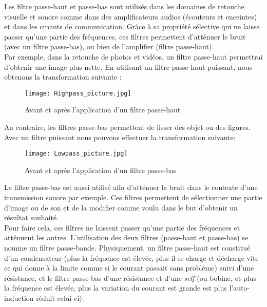 Les filtre passe-haut et passe-bas sont utilisés dans les domaines de retouche visuelle et sonore comme dans des amplificateurs audios (écouteurs et enceintes) et dans les circuits de communication. Grâce à sa propriété sélective qui ne laisse passer qu'une partie des fréquences, ces filtres permettent d'atténuer le bruit (avec un filtre passe-bas), ou bien de l'amplifier (filtre passe-haut). \\
Par exemple, dans la retouche de photos et vidéos, un filtre passe-haut permettrai d'obtenir une image plus nette. En utilisant un filtre passe-haut puissant, nous obtenons la transformation suivante :

\begin{figure}[H]
  \centering
    \texttt{[image: Highpass\_picture.jpg]}
    \caption[Avant et après l'application d'un filtre passe-haut]{Avant et après l'application d'un filtre passe-haut \footnotemark}
\end{figure}

Au contraire, les filtres passe-bas permettent de lisser des objet ou des figures. Avec un filtre puissant nous pouvons effectuer la transformation suivante: 

\begin{figure}[H]
  \centering
    \texttt{[image: Lowpass\_picture.jpg]}
    \caption[Avant et après l'application d'un filtre passe-bas]{Avant et après l'application d'un filtre passe-bas \footnotemark}
\end{figure}

Le filtre passe-bas est aussi utilisé afin d'atténuer le bruit dans le contexte d'une transmission sonore par exemple. Ces filtres permettent de sélectionner une partie d'image ou de son et de la modifier comme voulu dans le but d'obtenir un résultat souhaité. \\

Pour faire cela, ces filtres ne laissent passer qu'une partie des fréquences et atténuent les autres. L'utilisation des deux filtres (passe-haut et passe-bas) se nomme un filtre passe-bande. Physiquement, un filtre passe-haut est constitué d’un condensateur (plus la fréquence est élevée, plus il se charge et décharge vite ce qui donne à la limite comme si le courant passait sans problème) suivi d’une résistance, et le filtre passe-bas d'une résistance et d'une \textit{self} (ou bobine, et plus la fréquence est élevée, plus la variation du courant est grande est plus l'auto-induction réduit celui-ci).\\

